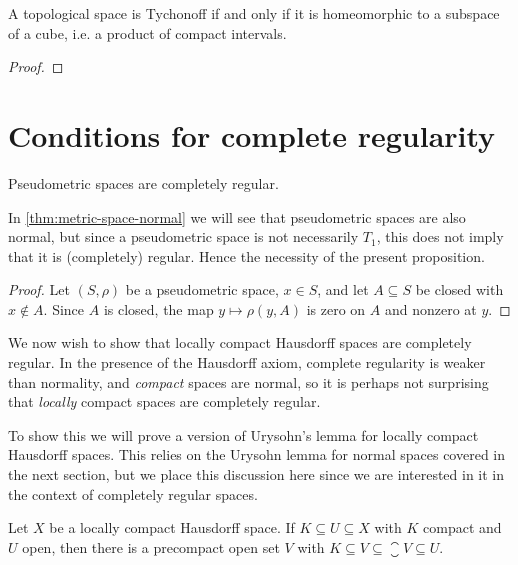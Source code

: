 \documentclass[article, a4paper, 11pt, oneside]{memoir}
\numberwithin{equation}{chapter}
\begin{document}
\begin{proposition}
    A topological space is Tychonoff if and only if it is homeomorphic to a subspace of a cube, i.e. a product of compact intervals.
\end{proposition} %

\begin{proof}
    
\end{proof}


\section{Conditions for complete regularity}

\begin{proposition}
    \label{thm:pseudometric-completely-regular}
    Pseudometric spaces are completely regular.
\end{proposition}
%
In \cref{thm:metric-space-normal} we will see that pseudometric spaces are also normal, but since a pseudometric space is not necessarily $T_1$, this does not imply that it is (completely) regular. Hence the necessity of the present proposition.

\begin{proof}
    Let $(S,\rho)$ be a pseudometric space, $x \in S$, and let $A \subseteq S$ be closed with $x \not\in A$. Since $A$ is closed, the map $y \mapsto \rho(y,A)$ is zero on $A$ and nonzero at $y$.
\end{proof}


We now wish to show that locally compact Hausdorff spaces are completely regular. In the presence of the Hausdorff axiom, complete regularity is weaker than normality, and \emph{compact} spaces are normal, so it is perhaps not surprising that \emph{locally} compact spaces are completely regular.

To show this we will prove a version of Urysohn's lemma for locally compact Hausdorff spaces. This relies on the Urysohn lemma for normal spaces covered in the next section, but we place this discussion here since we are interested in it in the context of completely regular spaces.


\begin{lemma}
    Let $X$ be a locally compact Hausdorff space. If $K \subseteq U \subseteq X$ with $K$ compact and $U$ open, then there is a precompact open set $V$ with $K \subseteq V \subseteq \closure{V} \subseteq U$.
\end{lemma}
\end{document}

